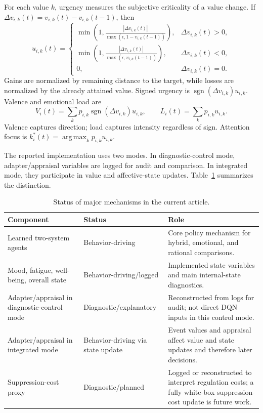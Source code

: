 \documentclass[runningheads]{llncs}
\newcommand{\argmaxop}{\operatorname*{arg\,max}}
\begin{document}
For each value $k$, urgency measures the subjective criticality of a value change. If $\Delta v_{i,k}(t)=v_{i,k}(t)-v_{i,k}(t-1)$, then
\[
u_{i,k}(t)=
\begin{cases}
\min\left(1,\frac{|\Delta v_{i,k}(t)|}{\max(\epsilon,1-v_{i,k}(t-1))}\right), & \Delta v_{i,k}(t)>0,\\
\min\left(1,\frac{|\Delta v_{i,k}(t)|}{\max(\epsilon,v_{i,k}(t-1))}\right), & \Delta v_{i,k}(t)<0,\\
0, & \Delta v_{i,k}(t)=0.
\end{cases}
\]
Gains are normalized by remaining distance to the target, while losses are normalized by the already attained value. Signed urgency is $\operatorname{sgn}(\Delta v_{i,k})u_{i,k}$. Valence and emotional load are
\[
V_i(t)=\sum_k p_{i,k}\operatorname{sgn}(\Delta v_{i,k})u_{i,k},\qquad
L_i(t)=\sum_k p_{i,k}u_{i,k}.
\]
Valence captures direction; load captures intensity regardless of sign. Attention focus is $k^*_i(t)=\argmaxop_k p_{i,k}u_{i,k}$.

The reported implementation uses two modes. In diagnostic-control mode, adapter/appraisal variables are logged for audit and comparison. In integrated mode, they participate in value and affective-state updates. Table~\ref{tab:status} summarizes the distinction.

\begin{table}[t]
\centering
\caption{Status of major mechanisms in the current article.}
\label{tab:status}
\scriptsize
\begin{tabular}{p{.28\linewidth}p{.26\linewidth}p{.36\linewidth}}
\toprule
Component & Status & Role \\
\midrule
Learned two-system agents & Behavior-driving & Core policy mechanism for hybrid, emotional, and rational comparisons. \\
Mood, fatigue, well-being, overall state & Behavior-driving/logged & Implemented state variables and main internal-state diagnostics. \\
Adapter/appraisal in diagnostic-control mode & Diagnostic/explanatory & Reconstructed from logs for audit; not direct DQN inputs in this control mode. \\
Adapter/appraisal in integrated mode & Behavior-driving via state update & Event values and appraisal affect value and state updates and therefore later decisions. \\
Suppression-cost proxy & Diagnostic/planned & Logged or reconstructed to interpret regulation costs; a fully white-box suppression-cost update is future work. \\
\bottomrule
\end{tabular}
\end{table}
\end{document}
